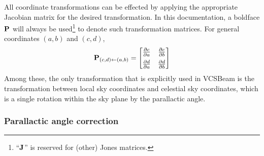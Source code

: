 \documentclass{book}
\newcommand{\vcsbeam}{{\sc VCSBeam}}
\newcommand{\pd}[2]{\ensuremath{\frac{\partial #1}{\partial #2}}}
\newcommand{\transmat}[4]{\ensuremath{{\bf P}_{(#3,#4)\leftarrow(#1,#2)}}}
\begin{document}
All coordinate transformations can be effected by applying the appropriate Jacobian matrix for the desired transformation.
In this documentation, a boldface ${\bf P}$ will always be used\footnote{``${\bf J}$'' is reserved for (other) Jones matrices.} to denote such transformation matrices.
For general coordinates $(a,b)$ and $(c,d)$,
\begin{equation}
    \transmat{a}{b}{c}{d} =
    \begin{bmatrix}
        \pd{c}{a} & \pd{c}{b} \\[5 pt]
        \pd{d}{a} & \pd{d}{b}
    \end{bmatrix}
\end{equation}
Among these, the only transformation that is explicitly used in \vcsbeam{} is the transformation between local sky coordinates and celestial sky coordinates, which is a single rotation within the sky plane by the parallactic angle.

\subsubsection{Parallactic angle correction}
\end{document}
